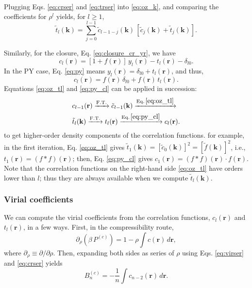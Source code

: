 \documentclass[aip,jcp,preprint,superscriptaddress,showpacs,preprintnumbers,amsmath,amssymb]{revtex4-1}
\newcommand{\vct}[1]{\mathbf{#1}}
\providecommand{\vr}{} %
\renewcommand{\vr}{\vct{r}}
\newcommand{\vk}{\vct{k}}
\begin{document}
Plugging Eqs. \eqref{eq:crser} and \eqref{eq:trser}
into \eqref{eq:oz_k},
and comparing the coefficients for $\rho^l$ yields,
for $l \ge 1$,
\begin{equation}
\tilde t_l(\vk)
=
\sum_{j = 0}^{l - 1}
\tilde c_{l - 1 -j}(\vk)
\,
[\tilde c_j(\vk) + \tilde t_j(\vk)].
\label{eq:oz_tl}
\end{equation}



Similarly, for the closure, Eq. \eqref{eq:closure_cr_yr},
we have
\begin{equation}
c_l(\vr)
=
[1 + f(\vr)] \, y_l(\vr)
- t_l(\vr) - \delta_{l0}.
\label{eq:closure_cl_yl}
\end{equation}
%
In the PY case,
Eq. \eqref{eq:py}
means $y_l(\vr) = \delta_{l0} + t_l(\vr)$,
and thus,
\begin{equation}
c_l(\vr)
= f(\vr) \, \delta_{l0} + f(\vr) \, t_l(\vr).
\label{eq:py_cl}
\end{equation}
%
Equations \eqref{eq:oz_tl} and \eqref{eq:py_cl}
can be applied in succession:
%
%
%
\begin{align*}
&
c_{l-1}(\vr)
\xrightarrow{ \mathrm{F.T.} }
\tilde c_{l-1}(\vk)
\xrightarrow{ \mathrm{Eq.\,\eqref{eq:oz_tl}} }
\\
&
\tilde t_l(\vk)
\xrightarrow{ \mathrm{F.T.} }
t_l(\vr)
\xrightarrow{ \mathrm{Eq.\,\eqref{eq:py_cl}} }
c_l(\vr).
\end{align*}
%
%
%
to get higher-order density components of the correlation functions.
%
for example,
in the first iteration,
Eq. \eqref{eq:oz_tl} gives
$\tilde t_1(\vk) = [\tilde c_0(\vk)]^2 = [\tilde f(\vk)]^2$,
i.e.,
$t_1(\vr) = (f*f)(\vr)$;
then, Eq. \eqref{eq:py_cl} gives
$c_1(\vr) = (f*f)(\vr) \cdot f(\vr)$.
%
Note that the correlation functions
on the right-hand side \eqref{eq:oz_tl}
have orders lower than $l$;
%
thus they are always available
when we compute $\tilde t_l(\vk)$.





\subsubsection{Virial coefficients}





We can compute the virial coefficients
from the correlation functions, $c_l(\vr)$ and $t_l(\vr)$,
in a few ways.
%
First, in the compressibility route,
%
\begin{equation}
\partial_\rho( \beta \, P^{(c)} )
=
1 - \rho \int c(\vr) \, d\vr,
\label{eq:P_compressibility}
\end{equation}
%
where $\partial_\rho \equiv \partial/\partial \rho$.
%
Then, expanding both sides as series of $\rho$
using Eqs. \eqref{eq:virser} and \eqref{eq:crser} yields
%
\begin{equation}
B_n^{(c)}
=
-\frac{1}{n}
\int c_{n-2}(\vr) \, d\vr.
\label{eq:Bn_compressibility}
\end{equation}
\end{document}

